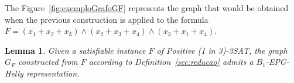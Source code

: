 \documentclass[preprint,12pt]{elsarticle} %
\newtheorem{lema}[theorem]{Lemma}
\begin{document}
The Figure~\ref{fig:exemploGrafoGF} represents the graph that would be obtained when the previous construction is applied to the formula $ F = (x_1 + x_2 + x_3) \wedge (x_2 + x_3 + x_4) \wedge (x_3 + x_1 + x_4)$.%





%


%

\begin{lema}\label{lem:ida}
Given a satisfiable instance $F$ of {\sc Positive (1 in 3)-3SAT}, the graph $G_F$ constructed from $F$ according to Definition~\ref{sec:reducao} admits a $B_{1}$-EPG-Helly representation.
\end{lema}

\end{document}
